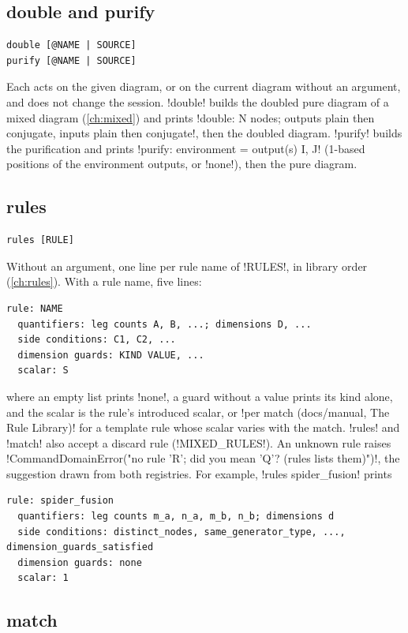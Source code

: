 \subsection{double and purify}

\begin{lstlisting}[style=azx]
double [@NAME | SOURCE]
purify [@NAME | SOURCE]
\end{lstlisting}
Each acts on the given diagram, or on the current diagram without an argument, and does not change the session. \azx!double! builds the doubled pure diagram of a mixed diagram (\cref{ch:mixed}) and prints \code!double: N nodes; outputs plain then conjugate, inputs plain then conjugate!, then the doubled diagram. \azx!purify! builds the purification and prints \code!purify: environment = output(s) I, J! (1-based positions of the environment outputs, or \code!none!), then the pure diagram.

\subsection{rules}

\begin{lstlisting}[style=azx]
rules [RULE]
\end{lstlisting}
Without an argument, one line per rule name of \py!RULES!, in library order (\cref{ch:rules}). With a rule name, five lines:
\begin{lstlisting}[style=grammar]
rule: NAME
  quantifiers: leg counts A, B, ...; dimensions D, ...
  side conditions: C1, C2, ...
  dimension guards: KIND VALUE, ...
  scalar: S
\end{lstlisting}
where an empty list prints \code!none!, a guard without a value prints its kind alone, and the scalar is the rule's introduced scalar, or \code!per match (docs/manual, The Rule Library)! for a template rule whose scalar varies with the match. \code!rules! and \code!match! also accept a discard rule (\py!MIXED_RULES!). An unknown rule raises \code!CommandDomainError("no rule 'R'; did you mean 'Q'? (rules lists them)")!, the suggestion drawn from both registries. For example, \azx!rules spider_fusion! prints
\begin{lstlisting}[style=grammar]
rule: spider_fusion
  quantifiers: leg counts m_a, n_a, m_b, n_b; dimensions d
  side conditions: distinct_nodes, same_generator_type, ..., dimension_guards_satisfied
  dimension guards: none
  scalar: 1
\end{lstlisting}

\subsection{match}

